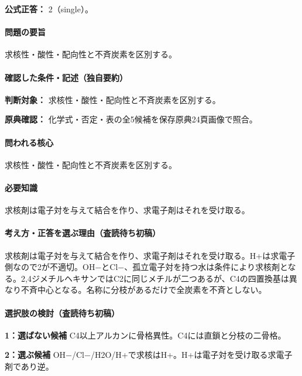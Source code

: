 \textbf{公式正答：} 2（single）。

\paragraph{問題の要旨} 求核性・酸性・配向性と不斉炭素を区別する。

\paragraph{確認した条件・記述（独自要約）}\mbox{}\par

\noindent\textbf{判断対象：} 求核性・酸性・配向性と不斉炭素を区別する。\par

\noindent\textbf{原典確認：} 化学式・否定・表の全5候補を保存原典24頁画像で照合。\par

\paragraph{問われる核心} 求核性・酸性・配向性と不斉炭素を区別する。

\paragraph{必要知識} 求核剤は電子対を与えて結合を作り、求電子剤はそれを受け取る。

\paragraph{考え方・正答を選ぶ理由（査読待ち初稿）} 求核剤は電子対を与えて結合を作り、求電子剤はそれを受け取る。H+は求電子側なので2が不適切。OH−とCl−、孤立電子対を持つ水は条件により求核剤となる。2,4ジメチルヘキサンではC2に同じメチルが二つあるが、C4の四置換基は異なり不斉中心となる。名称に分枝があるだけで全炭素を不斉としない。

\paragraph{選択肢の検討（査読待ち初稿）}\mbox{}\par

\noindent\textbf{1：選ばない候補} C4以上アルカンに骨格異性。C4には直鎖と分枝の二骨格。\par

\noindent\textbf{2：選ぶ候補} OH−/Cl−/H2O/H+で求核はH+。H+は電子対を受け取る求電子剤であり逆。\par

